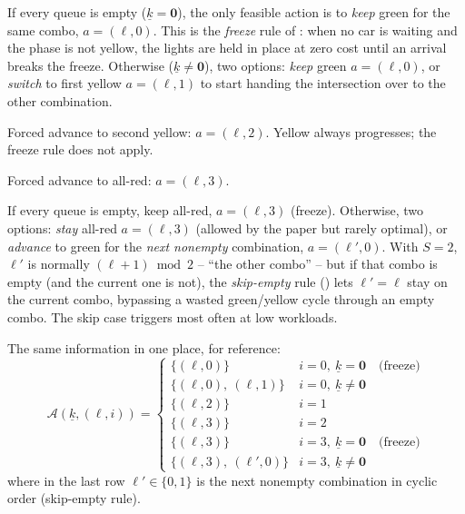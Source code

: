 \documentclass[11pt,a4paper]{article}
\newcommand{\A}{\mathcal{A}}
\begin{document}
\begin{description}[leftmargin=2em, style=nextline]
    \item[\textbf{Phase 0 (green for combo $\ell$).}]
        If every queue is empty ($\underline{k} = \mathbf{0}$), the
        only feasible action is to \emph{keep} green for the same
        combo, $a = (\ell, 0)$. This is the \emph{freeze} rule of
        \cite[\S 3.2]{haijema2008}: when no car is waiting and the
        phase is not yellow, the lights are held in place at zero
        cost until an arrival breaks the freeze.
        Otherwise ($\underline{k} \ne \mathbf{0}$), two options:
        \emph{keep} green $a = (\ell, 0)$, or
        \emph{switch} to first yellow $a = (\ell, 1)$ to start
        handing the intersection over to the other combination.
    \item[\textbf{Phase 1 (first yellow).}]
        Forced advance to second yellow: $a = (\ell, 2)$.
        Yellow always progresses; the freeze rule does not apply.
    \item[\textbf{Phase 2 (second yellow).}]
        Forced advance to all-red: $a = (\ell, 3)$.
    \item[\textbf{Phase 3 (all-red).}]
        If every queue is empty, keep all-red, $a = (\ell, 3)$
        (freeze). Otherwise, two options: \emph{stay} all-red
        $a = (\ell, 3)$ (allowed by the paper but rarely optimal),
        or \emph{advance} to green for the \emph{next nonempty}
        combination, $a = (\ell', 0)$. With $S = 2$, $\ell'$ is
        normally $(\ell + 1) \bmod 2$ -- ``the other combo'' -- but
        if that combo is empty (and the current one is not), the
        \emph{skip-empty} rule (\cite[\S 3.2]{haijema2008}) lets
        $\ell' = \ell$ stay on the current combo, bypassing a wasted
        green/yellow cycle through an empty combo. The skip case
        triggers most often at low workloads.
\end{description}

The same information in one place, for reference:
\begin{equation}
\A(\underline{k}, (\ell, i)) =
\begin{cases}
    \{(\ell, 0)\}                & i = 0,\ \underline{k} = \mathbf{0}
        \quad \text{(freeze)} \\
    \{(\ell, 0),\ (\ell, 1)\}     & i = 0,\ \underline{k} \ne \mathbf{0} \\
    \{(\ell, 2)\}                & i = 1 \\
    \{(\ell, 3)\}                & i = 2 \\
    \{(\ell, 3)\}                & i = 3,\ \underline{k} = \mathbf{0}
        \quad \text{(freeze)} \\
    \{(\ell, 3),\ (\ell', 0)\}    & i = 3,\ \underline{k} \ne \mathbf{0}
\end{cases}
\end{equation}
where in the last row $\ell' \in \{0, 1\}$ is the next nonempty
combination in cyclic order (skip-empty rule).
\end{document}
